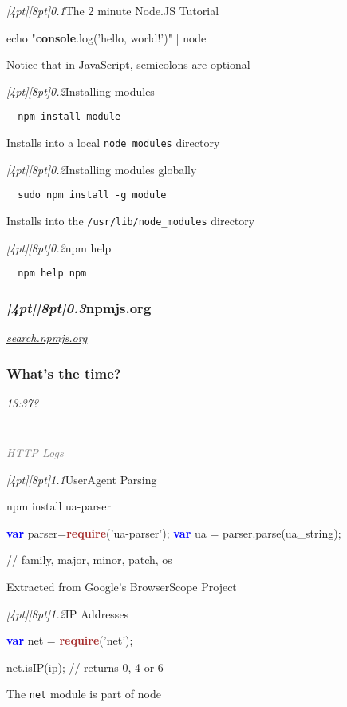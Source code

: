 \documentclass{beamer}
\newcommand{\sn}[1]{\textrm{\textit{\Huge{\raisebox{-3pt}[4pt][8pt]{\textcolor{f2elblue}{#1}}}}}\hspace{4pt}}
\newcommand{\innersplash}[1]{
  \begin{center}
    \large \textrm{\textit{ #1 } }
  \end{center}
}
\newcommand{\splashslide}[2][{}]{
  \begin{frame}
  \frametitle{#1}
  \innersplash{#2}
  \end{frame}
}
\newcommand{\leadinslide}[2]{
  \splashslide{
     {\fontsize{150}{20}\selectfont{\raisebox{0pt}[90pt][0pt]{\textcolor{light-gray}{#1}}}} \\ \huge \textcolor{gray}{#2}
  }
}
\def\brown<#1>#2{\textcolor<#1>{brown}{\textbf<#1>{#2}}}
\def\green<#1>#2{\textcolor<#1>{dark-green}{\textbf<#1>{#2}}}
\def\blue<#1>#2{\textcolor<#1>{blue}{\textbf<#1>{#2}}}
\begin{document}
\begin{frame}[fragile]{\sn{0.1}The 2 minute Node.JS Tutorial}
\begin{semiverbatim}
  echo "\green<1>{console}.log('hello, world!')" | node
\end{semiverbatim}
Notice that in JavaScript, semicolons are optional
\end{frame}

\begin{frame}[fragile]{\sn{0.2}Installing modules}
\begin{verbatim}
  npm install module
\end{verbatim}
Installs into a local \texttt{node\_modules} directory
\end{frame}


\begin{frame}[fragile]{\sn{0.2}Installing modules globally}
\begin{verbatim}
  sudo npm install -g module
\end{verbatim}
Installs into the \texttt{/usr/lib/node\_modules} directory
\end{frame}

\begin{frame}[fragile]{\sn{0.2}npm help}
\begin{verbatim}
  npm help npm
\end{verbatim}
\end{frame}

\splashslide[\sn{0.3}npmjs.org]{\LARGE \href{http://search.npmjs.org/}{search.npmjs.org}}

\splashslide[What's the time?]{\LARGE 13:37?}

\leadinslide{1}{HTTP Logs}
\begin{frame}[fragile]{\sn{1.1}UserAgent Parsing}
\begin{semiverbatim}
  npm install ua-parser

  \blue<1>{var} parser=\brown<1>{require}('ua-parser');
  \blue<1>{var} ua = parser.parse(ua\_string);

  // family, major, minor, patch, os
\end{semiverbatim}
Extracted from Google's BrowserScope Project
\end{frame}

\begin{frame}[fragile]{\sn{1.2}IP Addresses}
\begin{semiverbatim}
  \blue<1>{var} net = \brown<1>{require}('net');

  net.isIP(ip);  // returns 0, 4 or 6
\end{semiverbatim}
The \texttt{net} module is part of node
\end{frame}
\end{document}
